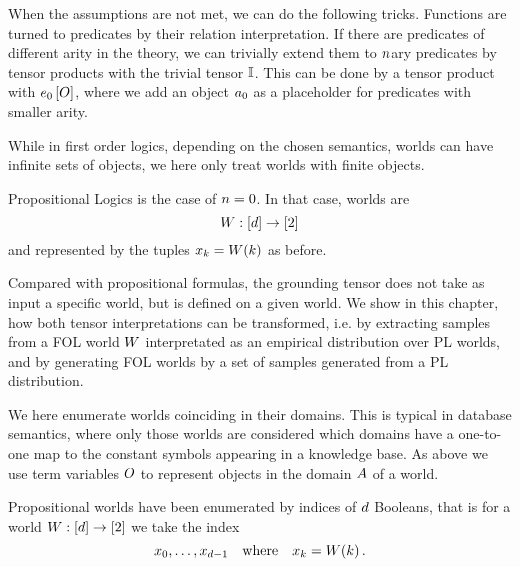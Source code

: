 When the assumptions are not met, we can do the following tricks.
Functions are turned to predicates by their relation interpretation.
If there are predicates of different arity in the theory, we can trivially extend them to $n$ary predicates by tensor products with the trivial tensor $\mathbb{I}$.
This can be done by a tensor product with $e_{0}\left[O\right]$, where we add an object $a_{0}$ as a placeholder for predicates with smaller arity.

While in first order logics, depending on the chosen semantics, worlds can have infinite sets of objects, we here only treat worlds with finite objects.



% 
Propositional Logics is the case of $n=0$.
In that case, worlds are
	\[ W: [d] \rightarrow [2] \]
and represented by the tuples $x_{k} = W(k)$ as before.

Compared with propositional formulas, the grounding tensor does not take as input a specific world, but is defined on a given world.
We show in this chapter, how both tensor interpretations can be transformed, i.e. by extracting samples from a FOL world $W$ interpretated as an empirical distribution over PL worlds, and by generating FOL worlds by a set of samples generated from a PL distribution.




We here enumerate worlds coinciding in their domains. 
This is typical in database semantics, where only those worlds are considered which domains have a one-to-one map to the constant symbols appearing in a knowledge base. %
As above we use term variables $O$ to represent objects in the domain $A$ of a world.

Propositional worlds have been enumerated by indices of $d$ Booleans, that is for a world $W: [d] \rightarrow [2]$ we take the index
	\[ {x_{0},\ldots,x_{d-1}} \quad \text{where} \quad x_{k} = W(k) \, .  \]

